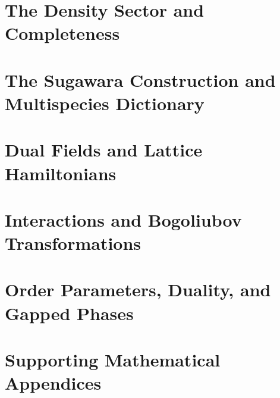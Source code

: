 \documentclass[11pt,a4paper,oneside]{book}
\begin{document}









\part{The Density Sector and Completeness}





\part{The Sugawara Construction and Multispecies Dictionary}




\part{Dual Fields and Lattice Hamiltonians}



\part{Interactions and Bogoliubov Transformations}




\part{Order Parameters, Duality, and Gapped Phases}



\appendix
\part{Supporting Mathematical Appendices}









\backmatter


\end{document}
